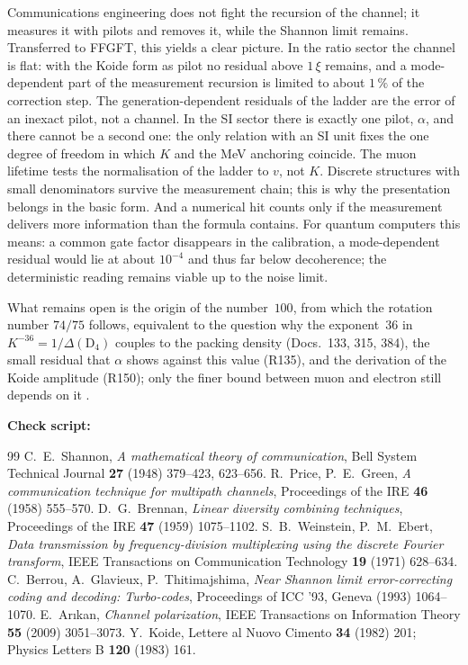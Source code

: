 Communications engineering does not fight the recursion of the channel; it measures it with pilots and
removes it, while the Shannon limit remains. Transferred to FFGFT, this yields a clear picture. In the
ratio sector the channel is flat: with the Koide form as pilot no residual above $1\,\xi$ remains, and
a mode-dependent part of the measurement recursion is limited to about $1\,\%$ of the correction step.
The generation-dependent residuals of the ladder are the error of an inexact pilot, not a channel. In
the SI sector there is exactly one pilot, $\alpha$, and there cannot be a second one: the only relation
with an SI unit fixes the one degree of freedom in which $K$ and the MeV anchoring coincide. The muon
lifetime tests the normalisation of the ladder to $v$, not $K$. Discrete
structures with small denominators survive the measurement chain; this is why the presentation belongs
in the basic form. And a numerical hit counts only if the measurement delivers more information than
the formula contains. For quantum computers this means: a common gate factor disappears in the
calibration, a mode-dependent residual would lie at about $10^{-4}$ and thus far below decoherence;
the deterministic reading remains viable up to the noise limit.

What remains open is the origin of the number~$100$, from which the rotation number $74/75$ follows,
equivalent to the question why the exponent~$36$ in $K^{-36}=1/\Delta(\mathrm{D}_4)$ couples to the
packing density (Docs.~133, 315, 384), the small residual that $\alpha$ shows against this value (R135), and the derivation of the Koide amplitude (R150); only the finer bound between muon and electron still
depends on it \SM.

\medskip
\noindent\textbf{Check script:} 

\begin{thebibliography}{99}
 C.~E.~Shannon, \textit{A mathematical theory of communication}, Bell System Technical Journal \textbf{27} (1948) 379--423, 623--656.
 R.~Price, P.~E.~Green, \textit{A communication technique for multipath channels}, Proceedings of the IRE \textbf{46} (1958) 555--570.
 D.~G.~Brennan, \textit{Linear diversity combining techniques}, Proceedings of the IRE \textbf{47} (1959) 1075--1102.
 S.~B.~Weinstein, P.~M.~Ebert, \textit{Data transmission by frequency-division multiplexing using the discrete Fourier transform}, IEEE Transactions on Communication Technology \textbf{19} (1971) 628--634.
 C.~Berrou, A.~Glavieux, P.~Thitimajshima, \textit{Near Shannon limit error-correcting coding and decoding: Turbo-codes}, Proceedings of ICC '93, Geneva (1993) 1064--1070.
 E.~Arıkan, \textit{Channel polarization}, IEEE Transactions on Information Theory \textbf{55} (2009) 3051--3073.
 Y.~Koide, Lettere al Nuovo Cimento \textbf{34} (1982) 201; Physics Letters B \textbf{120} (1983) 161.
\end{thebibliography}
